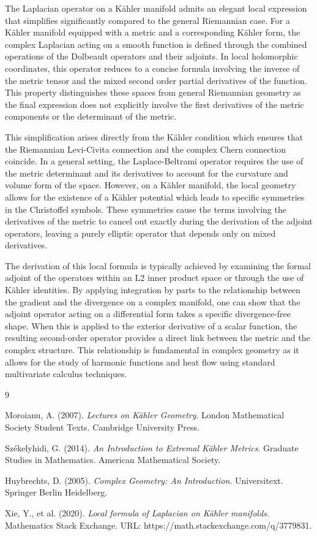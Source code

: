 \documentclass[12pt]{article}
\begin{document}
The Laplacian operator on a Kähler manifold admits an elegant local expression that simplifies significantly compared to the general Riemannian case. For a Kähler manifold equipped with a metric and a corresponding Kähler form, the complex Laplacian acting on a smooth function is defined through the combined operations of the Dolbeault operators and their adjoints. In local holomorphic coordinates, this operator reduces to a concise formula involving the inverse of the metric tensor and the mixed second order partial derivatives of the function. This property distinguishes these spaces from general Riemannian geometry as the final expression does not explicitly involve the first derivatives of the metric components or the determinant of the metric.

This simplification arises directly from the Kähler condition which ensures that the Riemannian Levi-Civita connection and the complex Chern connection coincide. In a general setting, the Laplace-Beltrami operator requires the use of the metric determinant and its derivatives to account for the curvature and volume form of the space. However, on a Kähler manifold, the local geometry allows for the existence of a Kähler potential which leads to specific symmetries in the Christoffel symbols. These symmetries cause the terms involving the derivatives of the metric to cancel out exactly during the derivation of the adjoint operators, leaving a purely elliptic operator that depends only on mixed derivatives.

The derivation of this local formula is typically achieved by examining the formal adjoint of the operators within an L2 inner product space or through the use of Kähler identities. By applying integration by parts to the relationship between the gradient and the divergence on a complex manifold, one can show that the adjoint operator acting on a differential form takes a specific divergence-free shape. When this is applied to the exterior derivative of a scalar function, the resulting second-order operator provides a direct link between the metric and the complex structure. This relationship is fundamental in complex geometry as it allows for the study of harmonic functions and heat flow using standard multivariate calculus techniques.

\begin{thebibliography}{9}

Moroianu, A. (2007). \textit{Lectures on Kähler Geometry}. London Mathematical Society Student Texts. Cambridge University Press.

Székelyhidi, G. (2014). \textit{An Introduction to Extremal Kähler Metrics}. Graduate Studies in Mathematics. American Mathematical Society.

Huybrechts, D. (2005). \textit{Complex Geometry: An Introduction}. Universitext. Springer Berlin Heidelberg.

Xie, Y., et al. (2020). \textit{Local formula of Laplacian on Kähler manifolds}. Mathematics Stack Exchange. URL: https://math.stackexchange.com/q/3779831.

\end{thebibliography}
\end{document}
